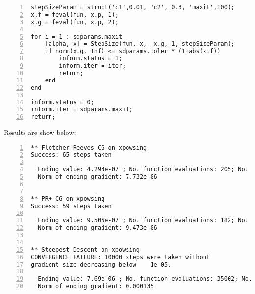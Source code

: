 \documentclass[12pt]{article}
\begin{document}
\begin{enumerate}
\begin{lstlisting}[language={[ANSI]C}, numbers=left, numberstyle=\tiny, frame=shadowbox, basicstyle=\ttfamily\small, showspaces=false, breaklines=true, showstringspaces=false, showtabs=false]
stepSizeParam = struct('c1',0.01, 'c2', 0.3, 'maxit',100);
x.f = feval(fun, x.p, 1);
x.g = feval(fun, x.p, 2);

for i = 1 : sdparams.maxit
    [alpha, x] = StepSize(fun, x, -x.g, 1, stepSizeParam);
    if norm(x.g, Inf) <= sdparams.toler * (1+abs(x.f))
        inform.status = 1;
        inform.iter = iter;
        return;
    end
end

inform.status = 0;
inform.iter = sdparams.maxit;
return;
\end{lstlisting}

\bigskip

Results are show below:

\bigskip

\begin{lstlisting}[language={[ANSI]C}, numbers=left, numberstyle=\tiny, frame=shadowbox, basicstyle=\ttfamily\small, showspaces=false, breaklines=true, showstringspaces=false, showtabs=false]
** Fletcher-Reeves CG on xpowsing
Success: 65 steps taken

  Ending value: 4.293e-07 ; No. function evaluations: 205; No. gradient evaluations 88
  Norm of ending gradient: 7.732e-06


** PR+ CG on xpowsing
Success: 59 steps taken

  Ending value: 9.506e-07 ; No. function evaluations: 182; No. gradient evaluations 86
  Norm of ending gradient: 9.473e-06


** Steepest Descent on xpowsing
CONVERGENCE FAILURE: 10000 steps were taken without
gradient size decreasing below    1e-05.

  Ending value: 7.69e-06 ; No. function evaluations: 35002; No. gradient evaluations 15001
  Norm of ending gradient: 0.000135
\end{lstlisting}

\end{enumerate}
\end{document}
